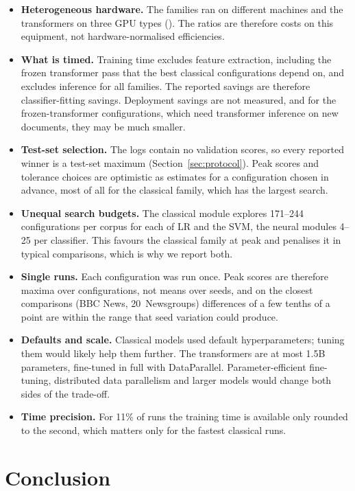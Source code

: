 \documentclass{ijis}
\begin{document}
\begin{itemize}
\setlength\itemsep{1pt}
\item \textbf{Heterogeneous hardware.} The families ran on different machines and the transformers on three GPU types (). The ratios are therefore costs on this equipment, not hardware-normalised efficiencies.
\item \textbf{What is timed.} Training time excludes feature extraction, including the frozen transformer pass that the best classical configurations depend on, and excludes inference for all families. The reported savings are therefore classifier-fitting savings. Deployment savings are not measured, and for the frozen-transformer configurations, which need transformer inference on new documents, they may be much smaller.
\item \textbf{Test-set selection.} The logs contain no validation scores, so every reported winner is a test-set maximum (Section~\ref{sec:protocol}). Peak scores and tolerance choices are optimistic as estimates for a configuration chosen in advance, most of all for the classical family, which has the largest search.
\item \textbf{Unequal search budgets.} The classical module explores 171--244 configurations per corpus for each of LR and the SVM, the neural modules 4--25 per classifier. This favours the classical family at peak and penalises it in typical comparisons, which is why we report both.
\item \textbf{Single runs.} Each configuration was run once. Peak scores are therefore maxima over configurations, not means over seeds, and on the closest comparisons (BBC News, 20~Newsgroups) differences of a few tenths of a point are within the range that seed variation could produce.
\item \textbf{Defaults and scale.} Classical models used default hyperparameters; tuning them would likely help them further. The transformers are at most 1.5B parameters, fine-tuned in full with DataParallel. Parameter-efficient fine-tuning, distributed data parallelism and larger models would change both sides of the trade-off.
\item \textbf{Time precision.} For 11\% of runs the training time is available only rounded to the second, which matters only for the fastest classical runs.
\end{itemize}

\section{Conclusion}\label{sec:conclusion}
\end{document}
